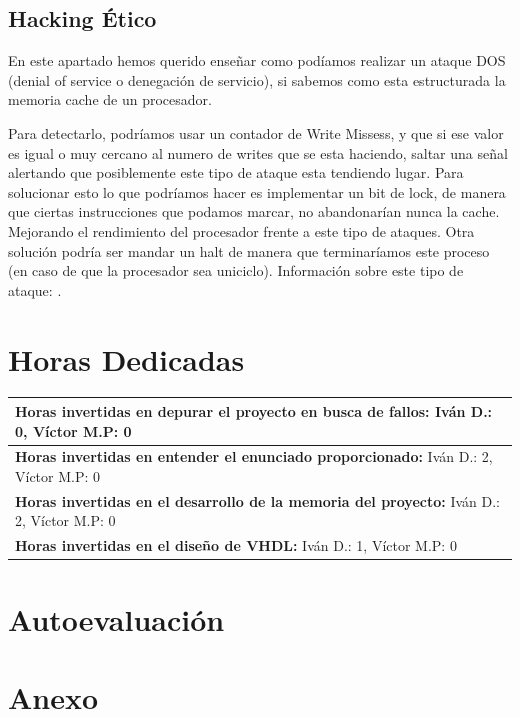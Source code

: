 \documentclass{article}
\newcommand{\horasVhdl}[2]{\textbf{Horas invertidas en el diseño de VHDL:} Iván D.: #1, Víctor M.P: #2\par\nointerlineskip}
\newcommand{\horasEntenderEnunciado}[2]{\textbf{Horas invertidas en entender el enunciado proporcionado:} Iván D.: #1, Víctor M.P: #2\par\nointerlineskip}
\newcommand{\horasDepuracion}[2]{\textbf{Horas invertidas en depurar el proyecto en busca de fallos:} Iván D.: #1, Víctor M.P: #2\par\nointerlineskip}
\newcommand{\horasMemoria}[2]{\textbf{Horas invertidas en el desarrollo de la memoria del proyecto:} Iván D.: #1, Víctor M.P: #2\par\nointerlineskip}
\begin{document}
\subsection{Hacking Ético}
En este apartado hemos querido enseñar como podíamos realizar un ataque DOS (denial of service o denegación de servicio), si sabemos como esta estructurada la memoria cache de un procesador.\par
Para detectarlo, podríamos usar un contador de Write Missess, y que si ese valor es igual o muy cercano al numero de writes que se esta haciendo, saltar una señal alertando que posiblemente este tipo de ataque esta tendiendo lugar. 
Para solucionar esto lo que podríamos hacer es implementar un bit de lock, de manera que ciertas instrucciones que podamos marcar, no abandonarían nunca la cache. Mejorando el rendimiento del procesador frente a este tipo de ataques. Otra solución podría ser mandar un 
halt de manera que terminaríamos este proceso (en caso de que la procesador sea uniciclo). 
Información sobre este tipo de ataque: \cite{BackCache}.

\section{Horas Dedicadas}

\begin{table}[h]
\centering
\begin{tabularx}{\textwidth}{|X|}
\hline
\horasDepuracion{0}{0} \\
\hline
\horasEntenderEnunciado{2}{0} \\
\hline
\horasMemoria{2}{0} \\
\hline
\horasVhdl{1}{0} \\
\hline
\end{tabularx}
\end{table}

\section{Autoevaluación}
\lipsum[15-18]

\newpage
\section{Anexo}
\end{document}
